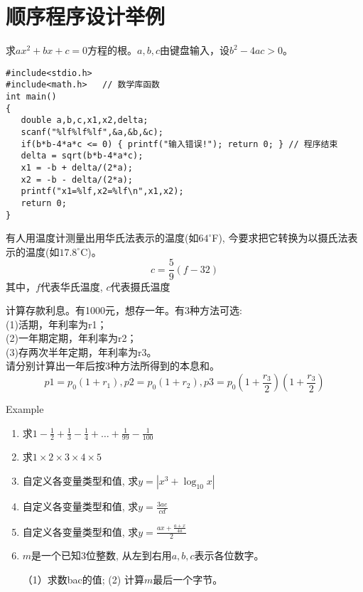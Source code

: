 \section{顺序程序设计举例}

\begin{frame}[fragile]
\begin{example}[例3.5 p64]
	求$ax^2+bx+c=0$方程的根。$a,b,c$由键盘输入，设$b^2-4ac>0$。
\end{example}
\begin{lstlisting}
#include<stdio.h>
#include<math.h>   // 数学库函数        
int main()                   
{                            
   double a,b,c,x1,x2,delta;
   scanf("%lf%lf%lf",&a,&b,&c);
   if(b*b-4*a*c <= 0) { printf("输入错误!"); return 0; } // 程序结束
   delta = sqrt(b*b-4*a*c);
   x1 = -b + delta/(2*a);
   x2 = -b - delta/(2*a);
   printf("x1=%lf,x2=%lf\n",x1,x2);
   return 0;           
}                            
\end{lstlisting}
\end{frame}

\begin{frame}[shrink]
\begin{example}[例3.1 p37]
	有人用温度计测量出用华氏法表示的温度(如$64^\circ$F), 
	今要求把它转换为以摄氏法表示的温度(如$17.8^\circ$C)。
	\[ c=\frac{5}{9}(f-32) \]
	其中，$f$代表华氏温度, $c$代表摄氏温度
\end{example}
\begin{example}[例3.2 p38]
	计算存款利息。有1000元，想存一年。有3种方法可选:\\
	(1)活期，年利率为r1；\\
	(2)一年期定期，年利率为r2；\\
	(3)存两次半年定期，年利率为r3。\\
	请分别计算出一年后按3种方法所得到的本息和。\\
	\[p1=p_0(1+r_1),p2=p_0(1+r_2),p3=p_0(1+\frac{r_3}{2})(1+\frac{r_3}{2}) \]
\end{example}
\end{frame}

\begin{frame}[shrink]{Example}
\begin{enumerate}
	\item 求$1-\frac{1}{2}+\frac{1}{3}-\frac{1}{4}+\dots+\frac{1}{99}-\frac{1}{100}$\\
	\item 求$1\times 2\times 3\times 4\times 5$\\
	\item 自定义各变量类型和值, 求$y=|x^3+\log_{10} x|$\\
	\item 自定义各变量类型和值, 求$y=\frac{3ae}{cd}$\\
	\item 自定义各变量类型和值, 求$y=\frac{ax+\frac{a+x}{4a}}{2}$\\
	\item $m$是一个已知3位整数, 从左到右用$a,b,c$表示各位数字。
	
	（1）求数bac的值; \quad (2) 计算$m$最后一个字节。
\end{enumerate}
\end{frame}

